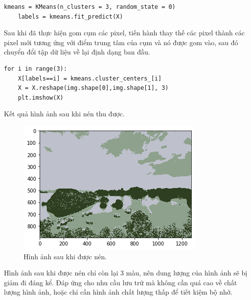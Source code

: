 \documentclass{article}
\begin{document}
	\begin{lstlisting}[style=myPythonStyle]
	kmeans = KMeans(n_clusters = 3, random_state = 0)
	labels = kmeans.fit_predict(X)
	\end{lstlisting}
	Sau khi đã thực hiện gom cụm các pixel, tiến hành thay thế các pixel thành các pixel mới tương ứng với điểm trung tâm của cụm và nó được gom vào, sau đó chuyển đổi tập dữ liệu về lại định dạng ban đầu.
	\begin{lstlisting}[style=myPythonStyle]
	for i in range(3):
    X[labels==i] = kmeans.cluster_centers_[i]
	X = X.reshape(img.shape[0],img.shape[1], 3)
	plt.imshow(X)
	\end{lstlisting}
	Kết quả hình ảnh sau khi nén thu được.
	\begin{figure}[h]
		\centering
		\includegraphics[width=0.6\linewidth]{img/vhlcompress}
		\caption{Hình ảnh sau khi được nén.}
	\end{figure}


	Hình ảnh sau khi được nén chỉ còn lại 3 màu, nên dung lượng của hình ảnh sẽ bị giảm đi đáng kể. Đáp ứng cho nhu cầu lưu trữ mà không cần quá cao về chất lượng hình ảnh, hoặc chỉ cần hình ảnh chất lượng thấp để tiết kiệm bộ nhớ.
\end{document}
